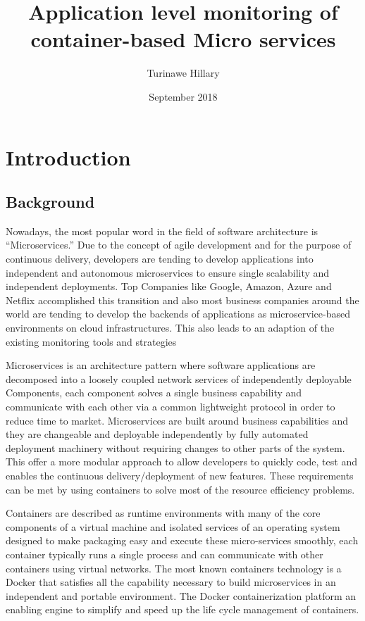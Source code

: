 \documentclass{article}
\title{Application level monitoring of container-based Micro services }
\author{Turinawe Hillary}
\date{September 2018}
\begin{document}
\maketitle

\section{Introduction}
\subsection{Background}
Nowadays, the most popular word in the field of software architecture is “Microservices.”   Due to the concept of agile development and for the purpose of continuous delivery, developers are tending to develop applications into independent and autonomous microservices to ensure single scalability and independent deployments. Top Companies like Google, Amazon, Azure and Netflix accomplished this transition and also most business companies around the world are tending to develop the backends of applications as microservice-based environments on cloud infrastructures. This also leads to an adaption of the existing monitoring tools and strategies

Microservices is an architecture pattern where software applications are decomposed into a loosely coupled network services of independently deployable Components, each component solves a single business capability and communicate with each other via a common lightweight protocol in order to reduce time to market.
Microservices are built around business capabilities and they are changeable and deployable independently by fully automated deployment machinery without requiring changes to other parts of the system. This offer a more modular approach to allow developers to quickly code, test and enables the continuous delivery/deployment of new features.  These requirements can be met by using containers to solve most of the resource efficiency problems.

Containers are described as runtime environments with many of the core components of a virtual machine and isolated services of an operating system designed to make packaging easy and execute these micro-services smoothly, each container typically runs a single process and can communicate with other containers using virtual networks. The most known containers technology is a Docker that satisfies all the capability necessary to build microservices in an independent and portable environment. The Docker containerization platform an enabling engine to simplify and speed up the life cycle management of containers.
\end{document}
